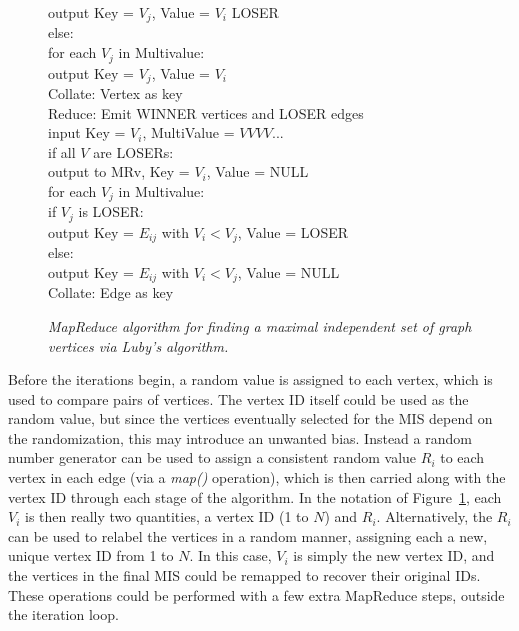 \begin{figure}[htb]
\begin{center}
{\begin{minipage}{\textwidth}
\begin{tabbing}
     \> \> \> \> \> output Key = $V_j$, Value = $V_i$ LOSER \\
       \> \> \> else: \\
      \> \> \> \> for each $V_j$ in Multivalue: \\
     \> \> \> \> \> output Key = $V_j$, Value = $V_i$ \\
 Collate: \> Vertex as key \\
 Reduce: \> Emit WINNER vertices and LOSER edges \\
       \> \> \> input Key = $V_i$, MultiValue = $V V V V ...$ \\
       \> \> \> if all $V$ are LOSERs: \\
      \> \> \> \> output to MRv, Key = $V_i$, Value = NULL \\
       \> \> \> for each $V_j$ in Multivalue: \\
      \> \> \> \> if $V_j$ is LOSER: \\
     \> \> \> \> \> output Key = $E_{ij}$ with $V_i < V_j$, Value = LOSER \\
      \> \> \> \> else: \\
     \> \> \> \> \> output Key = $E_{ij}$ with $V_i < V_j$, Value = NULL \\
 Collate: \> Edge as key \\

  \end{tabbing}
 \end{minipage}}\end{center}

 \caption{\it MapReduce algorithm for finding a maximal independent
 set of graph vertices via Luby's algorithm.}

 \label{fig:luby}
\end{figure}

Before the iterations begin, a random value is assigned to each
vertex, which is used to compare pairs of vertices.  The vertex ID
itself could be used as the random value, but since the vertices
eventually selected for the MIS depend on the randomization, this may
introduce an unwanted bias.  Instead a random number generator can be
used to assign a consistent random value $R_i$ to each vertex in each
edge (via a {\it map()} operation), which is then carried along with
the vertex ID through each stage of the algorithm.  In the notation of
Figure~\ref{fig:luby}, each $V_i$ is then really two quantities, a
vertex ID (1 to $N$) and $R_i$.  Alternatively, the $R_i$ can be used
to relabel the vertices in a random manner, assigning each a new,
unique vertex ID from 1 to $N$.  In this case, $V_i$ is simply the new
vertex ID, and the vertices in the final MIS could be remapped to
recover their original IDs.  These operations could be performed with
a few extra MapReduce steps, outside the iteration loop.

